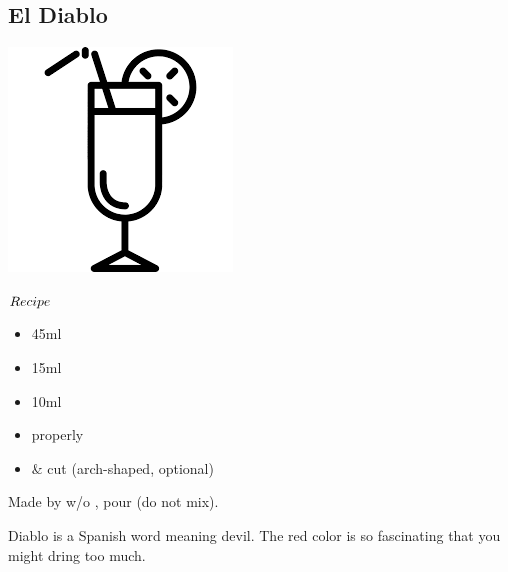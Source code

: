 \subsection{El Diablo}
\vspace{-7.8mm}
\hspace{32mm}
\includegraphics[scale=.07]{cocktail_glass_tall.png}
\vspace{2.mm}
\begin{itembox}[l]{\boldmath $Recipe$}
\begin{itemize}
\setlength{\parskip}{0cm}
\setlength{\itemsep}{0cm}
\item \teq 45ml
\item \cc 15ml
\item \lj 10ml
\item \ga properly
\item \cherry \& \lemon cut (arch-shaped, optional)
\end{itemize}
\vspace{-4mm}
Made by \build w/o \ga
\hspace{-1mm}, pour \ga (do not mix).
\end{itembox}
Diablo is a Spanish word meaning devil.
The red color is so fascinating that you might dring too much.
